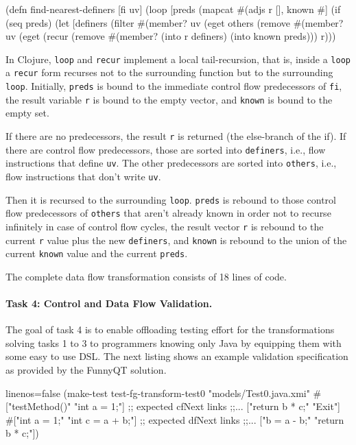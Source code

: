 \documentclass[submission]{eptcs}
\begin{document}
\begin{clojurecode}
(defn find-nearest-definers [fi uv]
  (loop [preds (mapcat #(adjs %
         r [], known #{}]
    (if (seq preds)
      (let [definers (filter #(member? uv (eget %
            others   (remove #(member? uv (eget %
        (recur (remove #(member? %
               (into r definers) (into known preds)))
      r)))
\end{clojurecode}

In Clojure, \verb|loop| and \verb|recur| implement a local tail-recursion, that
is, inside a \verb|loop| a \verb|recur| form recurses not to the surrounding
function but to the surrounding \verb|loop|.  Initially, \verb|preds| is bound
to the immediate control flow predecessors of \verb|fi|, the result variable
\verb|r| is bound to the empty vector, and \verb|known| is bound to the empty
set.

If there are no predecessors, the result \verb|r| is returned (the else-branch
of the if).  If there are control flow predecessors, those are sorted into
\verb|definers|, i.e., flow instructions that define \verb|uv|.  The other
predecessors are sorted into \verb|others|, i.e., flow instructions that don't
write \verb|uv|.

Then it is recursed to the surrounding \verb|loop|.  \verb|preds| is rebound to
those control flow predecessors of \verb|others| that aren't already known in
order not to recurse infinitely in case of control flow cycles, the result
vector \verb|r| is rebound to the current \verb|r| value plus the new
\verb|definers|, and \verb|known| is rebound to the union of the current
\verb|known| value and the current \verb|preds|.

The complete data flow transformation consists of 18 lines of code.


\paragraph{Task 4: Control and Data Flow Validation.}
\label{sec:task-4}

The goal of task 4 is to enable offloading testing effort for the
transformations solving tasks 1 to 3 to programmers knowing only Java by
equipping them with some easy to use DSL.  The next listing shows an example
validation specification as provided by the FunnyQT solution.

\begin{clojurecode*}{linenos=false}
(make-test test-fg-transform-test0 "models/Test0.java.xmi"
           #{["testMethod()"   "int a = 1;"]     ;; expected cfNext links
             ;;...
             ["return b * c;"  "Exit"]}
           #{["int a = 1;"     "int c = a + b;"] ;; expected dfNext links
             ;;...
             ["b = a - b;"     "return b * c;"]})
\end{clojurecode*}
\end{document}
